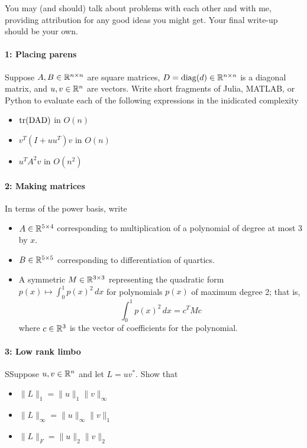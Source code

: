 \documentclass[12pt, leqno]{article} %
\begin{document}

You may (and should) talk about problems with each other and with me,
providing attribution for any good ideas you might get.  Your final
write-up should be your own.

\paragraph*{1: Placing parens}
Suppose $A, B \in \mathbb{R}^{n \times n}$ are square matrices, $D =
\operatorname{diag}(d) \in \mathbb{R}^{n \times n}$ is a diagonal matrix,
and $u, v \in \mathbb{R}^n$ are vectors.  Write short fragments of Julia,
MATLAB, or Python to evaluate each of the following expressions in
the inidicated complexity
\begin{itemize}
\item $\operatorname{\operatorname{tr}(DAD)}$ in $O(n)$
\item $v^T (I+uu^T)v$ in $O(n)$
\item $u^T A^2 v$ in $O(n^2)$
\end{itemize}

\paragraph*{2: Making matrices}
In terms of the power basis, write
\begin{itemize}
\item $A \in \mathbb{R}^{5 \times 4}$ corresponding to multiplication of a
  polynomial of degree at most $3$ by $x$.
\item $B \in \mathbb{R}^{5 \times 5}$ corresponding to differentiation of quartics.
\item A symmetric $M \in \mathbb{R}^{3 \times 3}$ representing the quadratic
  form $p(x) \mapsto \int_0^1 p(x)^2 \, dx$ for polynomials $p(x)$ of
  maximum degree 2; that is,
  \[
    \int_0^1 p(x)^2 \, dx = c^T M c
  \]
  where $c \in \mathbb{R}^3$ is the vector of coefficients for the
  polynomial.
\end{itemize}

\paragraph*{3: Low rank limbo}
SSuppose $u, v \in \mathbb{R}^n$ and let $L = uv^*$.  Show that
\begin{itemize}
\item $\|L\|_1 = \|u\|_1 \|v\|_\infty$
\item $\|L\|_\infty = \|u\|_\infty \|v\|_1$
\item $\|L\|_F = \|u\|_2 \|v\|_2$
\end{itemize}
\end{document}
